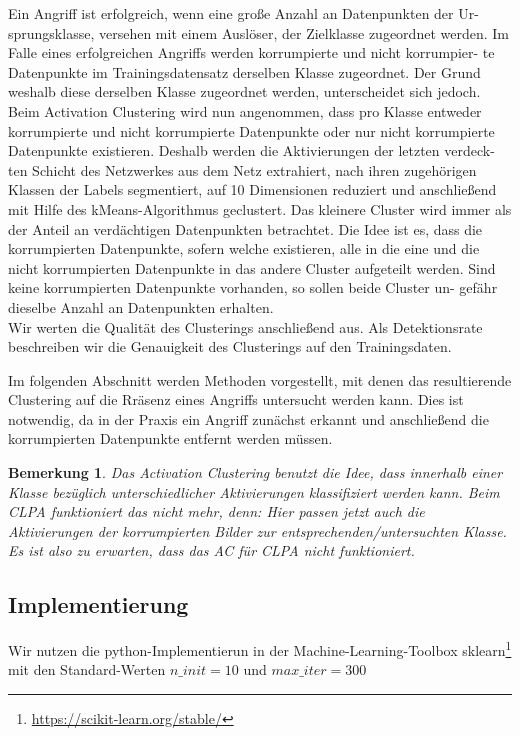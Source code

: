 \documentclass[11pt,a4paper]{article}
\newtheorem{remark}[theorem]{Bemerkung}
\numberwithin{equation}{section}
\begin{document}
	Ein Angriff ist erfolgreich, wenn eine große Anzahl an Datenpunkten der Ur-
	sprungsklasse, versehen mit einem Auslöser, der Zielklasse zugeordnet werden.
	Im Falle eines erfolgreichen Angriffs werden korrumpierte und nicht korrumpier-
	te Datenpunkte im Trainingsdatensatz derselben Klasse zugeordnet. Der Grund
	weshalb diese derselben Klasse zugeordnet werden, unterscheidet sich jedoch.
	Beim Activation Clustering wird nun angenommen, dass pro Klasse entweder
	korrumpierte und nicht korrumpierte Datenpunkte oder nur nicht korrumpierte
	Datenpunkte existieren. Deshalb werden die Aktivierungen der letzten verdeck-
	ten Schicht des Netzwerkes aus dem Netz extrahiert, nach ihren zugehörigen
	Klassen der Labels segmentiert, auf 10 Dimensionen reduziert und anschließend
	mit Hilfe des kMeans-Algorithmus geclustert. Das kleinere Cluster wird immer
	als der Anteil an verdächtigen Datenpunkten betrachtet. Die Idee ist es, dass
	die korrumpierten Datenpunkte, sofern welche existieren, alle in die eine und
	die nicht korrumpierten Datenpunkte in das andere Cluster aufgeteilt werden.
	Sind keine korrumpierten Datenpunkte vorhanden, so sollen beide Cluster un-
	gefähr dieselbe Anzahl an Datenpunkten erhalten.\\
	
	Wir werten die Qualität des Clusterings anschließend aus. Als Detektionsrate
	beschreiben wir die Genauigkeit des Clusterings auf den Trainingsdaten.
	
	Im folgenden Abschnitt werden Methoden vorgestellt, mit denen das resultierende Clustering auf die Rräsenz eines Angriffs untersucht werden kann. Dies ist notwendig, da in der Praxis ein Angriff zunächst erkannt und anschließend die korrumpierten Datenpunkte entfernt werden müssen. 
	
	\begin{remark}
		Das Activation Clustering benutzt die Idee, dass innerhalb einer Klasse bezüglich unterschiedlicher Aktivierungen klassifiziert werden kann. Beim CLPA funktioniert das nicht mehr, denn: Hier passen jetzt auch die Aktivierungen der korrumpierten Bilder zur entsprechenden/untersuchten Klasse. Es ist also zu erwarten, dass das AC für CLPA nicht funktioniert.
	\end{remark}
	
	\subsection{Implementierung}
	Wir nutzen die python-Implementierun in der Machine-Learning-Toolbox sklearn\footnote{\url{https://scikit-learn.org/stable/}} mit den Standard-Werten $n\_init=10$ und $max\_iter=300$
	
\end{document}
